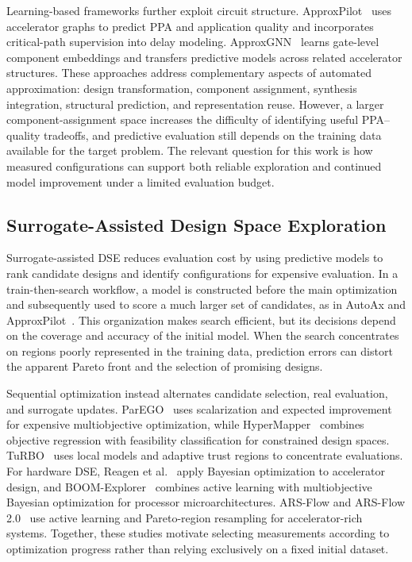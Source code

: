 Learning-based frameworks further exploit circuit structure.
ApproxPilot~\cite{zhang2025approxpilot} uses accelerator graphs to predict PPA and application quality and incorporates critical-path supervision into delay modeling.
ApproxGNN~\cite{vlcek2025approxgnn} learns gate-level component embeddings and transfers predictive models across related accelerator structures.
These approaches address complementary aspects of automated approximation: design transformation, component assignment, synthesis integration, structural prediction, and representation reuse.
However, a larger component-assignment space increases the difficulty of identifying useful PPA--quality tradeoffs, and predictive evaluation still depends on the training data available for the target problem.
The relevant question for this work is how measured configurations can support both reliable exploration and continued model improvement under a limited evaluation budget.

\subsection{Surrogate-Assisted Design Space Exploration}

Surrogate-assisted DSE reduces evaluation cost by using predictive models to rank candidate designs and identify configurations for expensive evaluation.
In a train-then-search workflow, a model is constructed before the main optimization and subsequently used to score a much larger set of candidates, as in AutoAx and ApproxPilot~\cite{mrazek2019autoax,zhang2025approxpilot}.
This organization makes search efficient, but its decisions depend on the coverage and accuracy of the initial model.
When the search concentrates on regions poorly represented in the training data, prediction errors can distort the apparent Pareto front and the selection of promising designs.

Sequential optimization instead alternates candidate selection, real evaluation, and surrogate updates.
ParEGO~\cite{knowles2006parego} uses scalarization and expected improvement for expensive multiobjective optimization, while HyperMapper~\cite{nardi2019hypermapper} combines objective regression with feasibility classification for constrained design spaces.
TuRBO~\cite{eriksson2019turbo} uses local models and adaptive trust regions to concentrate evaluations.
For hardware DSE, Reagen et al.~\cite{reagen2017bayesopt} apply Bayesian optimization to accelerator design, and BOOM-Explorer~\cite{bai2021boomexplorer} combines active learning with multiobjective Bayesian optimization for processor microarchitectures.
ARS-Flow and ARS-Flow 2.0~\cite{huang2024arsflow,huang2025arsflow2} use active learning and Pareto-region resampling for accelerator-rich systems.
Together, these studies motivate selecting measurements according to optimization progress rather than relying exclusively on a fixed initial dataset.

